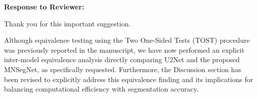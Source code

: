 \documentclass[12pt,letterpaper]{article}
\begin{document}
\begin{enumerate}
 

\textbf{Response to Reviewer:}

Thank you for this important suggestion.

Although equivalence testing using the Two One-Sided Tests (TOST) procedure was previously reported in the manuscript, we have now performed an explicit inter-model equivalence analysis directly comparing U2Net and the proposed MNSegNet, as specifically requested. Furthermore, the Discussion section has been revised to explicitly address this equivalence finding and its implications for balancing computational efficiency with segmentation accuracy.






\begin{table}[htbp]
\centering
{\color{red}

\caption{Two One-Sided Tests (TOST) equivalence analysis of frame-level DSC between MNSegNet and U2Net. It reports the mean difference, 95\% confidence interval, and equivalence decisions under predefined DSC margins.}

\label{tab:u2net_tost_equivalence_on_dsc}
\renewcommand{\arraystretch}{1.15}
}
\end{table}

 

 


\end{enumerate}
\end{document}
